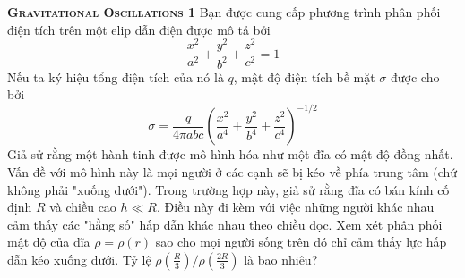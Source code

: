 \begin{problem}
\textbf{\textsc{Gravitational Oscillations 1}}
Bạn được cung cấp phương trình phân phối điện tích trên một elip dẫn điện được mô tả bởi 
\[
\frac{x^2}{a^2} + \frac{y^2}{b^2} + \frac{z^2}{c^2} = 1
\]
Nếu ta ký hiệu tổng điện tích của nó là \(q\), mật độ điện tích bề mặt \(\sigma\) được cho bởi
\begin{equation*}
\sigma = \frac{q}{4\pi abc} \left( \frac{x^2}{a^4} + \frac{y^2}{b^4} + \frac{z^2}{c^4} \right)^{-1 / 2}
\label{ellipsoidCharge}
\end{equation*}
Giả sử rằng một hành tinh được mô hình hóa như một đĩa có mật độ đồng nhất. Vấn đề với mô hình này là mọi người ở các cạnh sẽ bị kéo về phía trung tâm (chứ không phải "xuống dưới"). Trong trường hợp này, giả sử rằng đĩa có bán kính cố định \(R\) và chiều cao \(h \ll R\). Điều này đi kèm với việc những người khác nhau cảm thấy các "hằng số" hấp dẫn khác nhau theo chiều dọc. Xem xét phân phối mật độ của đĩa \(\rho = \rho(r)\) sao cho mọi người sống trên đó chỉ cảm thấy lực hấp dẫn kéo xuống dưới. Tỷ lệ $\rho(\frac{R}{3})/\rho(\frac{2R}{3})$ là bao nhiêu?

\end{problem}
